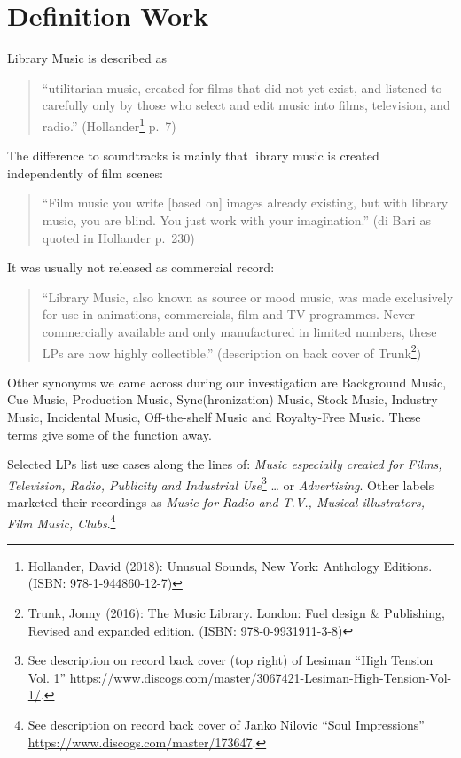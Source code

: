 \documentclass[a4paper,
fontsize=11pt,
oneside,
numbers=noperiodatend,
parskip=half-,
bibliography=totoc,
final
]{scrartcl}
\begin{document}
\pagebreak
\hypertarget{definition-work}{%
\section{Definition Work}\label{definition-work}}

Library Music is described as

\begin{quote}
\enquote{utilitarian music, created for films that did not yet exist,
and listened to carefully only by those who select and edit music into
films, television, and radio.} (Hollander\footnote{Hollander, David
  (2018): Unusual Sounds, New York: Anthology Editions. (ISBN:
  978-1-944860-12-7)} p.~7)
\end{quote}

The difference to soundtracks is mainly that library music is created
independently of film scenes:

\begin{quote}
\enquote{Film music you write {[}based on{]} images already existing,
but with library music, you are blind. You just work with your
imagination.} (di Bari as quoted in Hollander p.~230)
\end{quote}

It was usually not released as commercial record:

\begin{quote}
\enquote{Library Music, also known as source or mood music, was made
exclusively for use in animations, commercials, film and TV programmes.
Never commercially available and only manufactured in limited numbers,
these LPs are now highly collectible.} (description on back cover of
Trunk\footnote{Trunk, Jonny (2016): The Music Library. London: Fuel
  design \& Publishing, Revised and expanded edition. (ISBN:
  978-0-9931911-3-8)})
\end{quote}

Other synonyms we came across during our investigation are Background
Music, Cue Music, Production Music, Sync(hronization) Music, Stock
Music, Industry Music, Incidental Music, Off-the-shelf Music and
Royalty-Free Music. These terms give some of the function away.

Selected LPs list use cases along the lines of: \emph{Music especially
created for Films, Television, Radio, Publicity and Industrial
Use}\footnote{See description on record back cover (top right) of
  Lesiman \enquote{High Tension Vol. 1}
  \url{https://www.discogs.com/master/3067421-Lesiman-High-Tension-Vol-1/}.}
\ldots{} or \emph{Advertising}. Other labels marketed their recordings
as \emph{Music for Radio and T.V., Musical illustrators, Film Music,
Clubs}.\footnote{See description on record back cover of Janko Nilovic
  \enquote{Soul Impressions}
  \url{https://www.discogs.com/master/173647}.}
\end{document}
